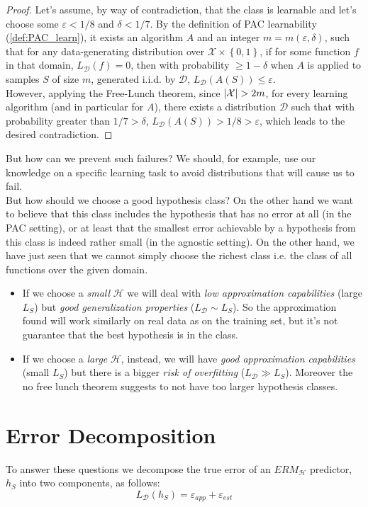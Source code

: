 \documentclass[12pt]{report}
\theoremstyle{plain}
\newcommand\mcl[1]{\mathcal{#1}}
\begin{document}
\begin{flushleft}
\begin{proof}
	Let's assume, by way of contradiction, that the class is learnable and let's choose some $\varepsilon <1/8$ and $\delta <1/7$. By the definition of PAC learnability (\ref{def:PAC_learn}), it exists an algorithm $A$ and an integer $m=m(\varepsilon,\delta)$, such that for any data-generating distribution over $\mcl{X}\times\left\{0,1\right\}$, if for some function $f$ in that domain, $L_\mcl{D}(f)=0$, then with probability $\geq 1-\delta$ when $A$ is applied to samples $S$ of size $m$, generated i.i.d. by $\mcl{D}$, $L_\mcl{D}(A(S))\leq\varepsilon$.\\
	However, applying the Free-Lunch theorem, since $\abs{\mcl{X}}>2m$, for every learning algorithm (and in particular for $A$), there exists a distribution $\mcl{D}$ such that with probability greater than $1/7 >\delta$, $L_\mcl{D}(A(S)) >1/8 >\varepsilon$, which leads to the desired contradiction.
\end{proof}

But how can we prevent such failures? We should, for example, use our knowledge on a specific learning task to avoid distributions that will cause us to fail.\\
But how should we choose a good hypothesis class? On the other hand we want to believe that this class includes the hypothesis that has no error at all (in the PAC setting), or at least that the smallest error achievable by a hypothesis from this class is indeed rather small (in the agnostic setting). On the other hand, we have just seen that we cannot simply choose the richest class i.e. the class of all functions over the given domain.\\
\begin{itemize}
	\item If we choose a \textit{small} $\mcl{H}$ we will deal with \textit{low approximation capabilities} (large $L_S$) but \textit{good generalization properties} ($L_\mcl{D}\sim L_S$). So the approximation found will work similarly on real data as on the training set, but it's not guarantee that the best hypothesis is in the class.
	\item If we choose a \textit{large} $\mcl{H}$, instead, we will have \textit{good approximation capabilities} (small $L_S$) but there is a bigger \textit{risk of overfitting} ($L_\mcl{D}\gg L_S$). Moreover the no free lunch theorem suggests to not have too larger hypothesis classes.
\end{itemize}

\section{Error Decomposition}
To answer these questions we decompose the true error of an $ERM_\mcl{H}$ predictor, $h_S$ into two components, as follows:
\[ L_\mcl{D}(h_S)=\varepsilon_{app}+\varepsilon_{est} \]


\end{flushleft}
\end{document}
